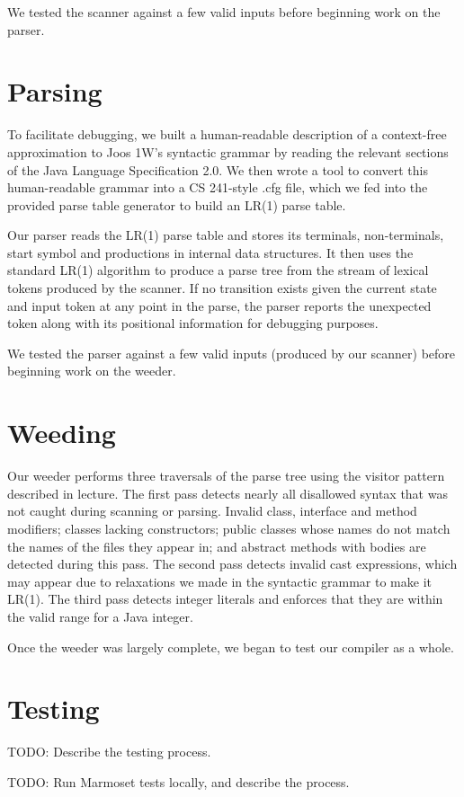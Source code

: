 \documentclass[12pt]{article}
\begin{document}
We tested the scanner against a few valid inputs before beginning work on the parser.

\section{Parsing}

To facilitate debugging, we built a human-readable description of a context-free approximation to Joos 1W's syntactic grammar by reading the relevant sections of the Java Language Specification 2.0.  We then wrote a tool to convert this human-readable grammar into a CS 241-style .cfg file, which we fed into the provided parse table generator to build an LR(1) parse table.

Our parser reads the LR(1) parse table and stores its terminals, non-terminals, start symbol and productions in internal data structures.  It then uses the standard LR(1) algorithm to produce a parse tree from the stream of lexical tokens produced by the scanner.  If no transition exists given the current state and input token at any point in the parse, the parser reports the unexpected token along with its positional information for debugging purposes.

We tested the parser against a few valid inputs (produced by our scanner) before beginning work on the weeder.

\section{Weeding}

Our weeder performs three traversals of the parse tree using the visitor pattern described in lecture.  The first pass detects nearly all disallowed syntax that was not caught during scanning or parsing.  Invalid class, interface and method modifiers; classes lacking constructors; public classes whose names do not match the names of the files they appear in; and abstract methods with bodies are detected during this pass.  The second pass detects invalid cast expressions, which may appear due to relaxations we made in the syntactic grammar to make it LR(1).  The third pass detects integer literals and enforces that they are within the valid range for a Java integer.

Once the weeder was largely complete, we began to test our compiler as a whole.

\section{Testing}

TODO: Describe the testing process.

TODO: Run Marmoset tests locally, and describe the process.
\end{document}
